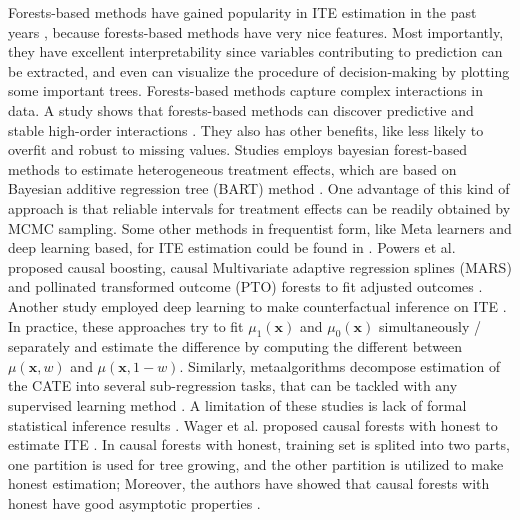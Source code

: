     Forests-based methods have gained popularity in ITE estimation in the past years \cite{wager2018estimation,kunzel2019metalearners,lu2018estimating,dasgupta2014risk,hill2013assessing,hill2013assessing,green2012modeling}, because forests-based methods have very nice features. Most importantly, they have excellent interpretability since variables contributing to prediction can be extracted, and even can visualize the procedure of decision-making by plotting some important trees. Forests-based methods capture complex interactions in data. A study shows that forests-based methods can discover predictive and stable high-order interactions \cite{basu2018iterative}. They also has other benefits, like less likely to overfit and robust to missing values. Studies \cite{green2012modeling,hill2011bayesian, hill2013assessing} employs bayesian forest-based methods to estimate heterogeneous treatment effects, which are based on Bayesian additive regression tree (BART) method \cite{chipman2010bart}. One advantage of this kind of approach is that reliable intervals for treatment effects can be readily obtained by MCMC sampling. Some other methods in frequentist form, like Meta learners and deep learning based, for ITE estimation could be found in \cite{kunzel2019metalearners,johansson2016learning,powers2017some}. Powers et al. proposed causal boosting, causal Multivariate adaptive regression splines (MARS) and pollinated transformed outcome (PTO) forests to fit adjusted outcomes \cite{powers2017some}. Another study employed deep learning to make counterfactual inference on ITE \cite{johansson2016learning}. In practice, these approaches try to fit $\mu_1(\mathbf{x})$ and $\mu_0(\mathbf{x})$ simultaneously / separately and estimate the difference by computing the different between $\mu(\mathbf{x},w)$ and $\mu(\mathbf{x}, 1-w)$.  Similarly, metaalgorithms decompose estimation of the CATE into several sub-regression tasks, that can be tackled with any supervised learning method \cite{kunzel2019metalearners}. A limitation of these studies is lack of formal statistical inference results \cite{wager2018estimation}. Wager et al. proposed causal forests with honest to estimate ITE \cite{wager2018estimation}. In causal forests with honest, training set is splited into two parts, one partition is used for tree growing, and the other partition is utilized to make honest estimation; Moreover, the authors have showed that causal forests with honest have good asymptotic properties \cite{wager2018estimation}.
  
